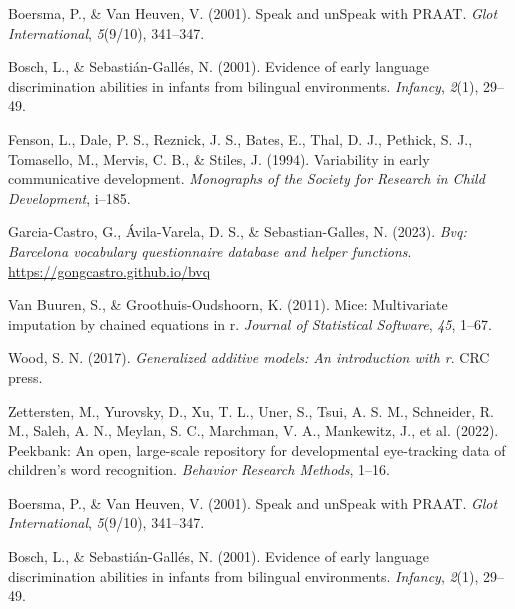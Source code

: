\documentclass[
  letterpaper,
  DIV=11,
  numbers=noendperiod]{scrartcl}
\newlength{\cslhangindent}
\newlength{\cslentryspacingunit} %
\newenvironment{CSLReferences}[2] %
 {%
  \setlength{\parindent}{0pt}
  \ifodd #1
  \let\oldpar\par
  \def\par{\hangindent=\cslhangindent\oldpar}
  \fi
  \setlength{\parskip}{#2\cslentryspacingunit}
 }%
 {}
\begin{document}
\hypertarget{refs}{}
\begin{CSLReferences}{1}{0}
\leavevmode{}%
Boersma, P., \& Van Heuven, V. (2001). Speak and unSpeak with PRAAT.
\emph{Glot International}, \emph{5}(9/10), 341--347.

\leavevmode{}%
Bosch, L., \& Sebastián-Gallés, N. (2001). Evidence of early language
discrimination abilities in infants from bilingual environments.
\emph{Infancy}, \emph{2}(1), 29--49.

\leavevmode{}%
Fenson, L., Dale, P. S., Reznick, J. S., Bates, E., Thal, D. J.,
Pethick, S. J., Tomasello, M., Mervis, C. B., \& Stiles, J. (1994).
Variability in early communicative development. \emph{Monographs of the
Society for Research in Child Development}, i--185.

\leavevmode{}%
Garcia-Castro, G., Ávila-Varela, D. S., \& Sebastian-Galles, N. (2023).
\emph{Bvq: Barcelona vocabulary questionnaire database and helper
functions}. \url{https://gongcastro.github.io/bvq}

\leavevmode{}%
Van Buuren, S., \& Groothuis-Oudshoorn, K. (2011). Mice: Multivariate
imputation by chained equations in r. \emph{Journal of Statistical
Software}, \emph{45}, 1--67.

\leavevmode{}%
Wood, S. N. (2017). \emph{Generalized additive models: An introduction
with r}. CRC press.

\leavevmode{}%
Zettersten, M., Yurovsky, D., Xu, T. L., Uner, S., Tsui, A. S. M.,
Schneider, R. M., Saleh, A. N., Meylan, S. C., Marchman, V. A.,
Mankewitz, J., et al. (2022). Peekbank: An open, large-scale repository
for developmental eye-tracking data of children's word recognition.
\emph{Behavior Research Methods}, 1--16.

\leavevmode{}%
Boersma, P., \& Van Heuven, V. (2001). Speak and unSpeak with PRAAT.
\emph{Glot International}, \emph{5}(9/10), 341--347.

\leavevmode{}%
Bosch, L., \& Sebastián-Gallés, N. (2001). Evidence of early language
discrimination abilities in infants from bilingual environments.
\emph{Infancy}, \emph{2}(1), 29--49.


\end{CSLReferences}
\end{document}
